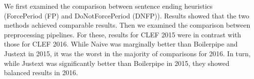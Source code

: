 We first examined the comparison between sentence ending heuristics (ForcePeriod (FP) and DoNotForcePeriod (DNFP)). Results showed that the two methods achieved comparable results. Then we examined the comparison between preprocessing pipelines. For these, results for CLEF 2015 were in contrast with those for CLEF 2016. While Naive was marginally better than Boilerpipe and Justext in 2015, it was the worst in the majority of comparisons for 2016. In turn, while Justext was significantly better than Boilerpipe in 2015, they showed balanced results in 2016.
 



%

%


